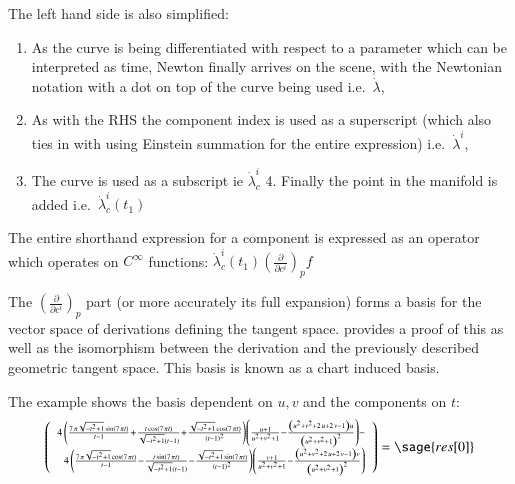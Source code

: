 \documentclass[11pt]{article}
\begin{document}
The left hand side is also simplified: 
\begin{enumerate}[itemsep=1pt, topsep=1pt, partopsep=0pt]
    \item As the curve is being differentiated with respect to a parameter which can be interpreted as time, Newton finally arrives on the scene, 
    with the Newtonian notation with a dot on top of the curve being used i.e.~\(\dot \lambda\),
    \item As with the RHS the component index is used as a superscript (which also ties in with using Einstein summation for the entire expression)
    i.e.~\(\dot \lambda^i\),
    \item The curve is used as a subscript ie \(\dot \lambda^i_c\) 4. Finally the point in the manifold is added i.e.~\(\dot \lambda^i_c(t_1)\)
\end{enumerate}    

The entire shorthand expression for a component is expressed as an operator which operates on
\(C^\infty\) functions: \(\dot \lambda^i_c(t_1) (\frac{\partial }{\partial c^i})_pf\)

The \((\frac{\partial }{\partial c^i})_p\) part (or more accurately its full expansion) forms a
basis for the vector space of derivations defining the tangent space.
\Textcite[see][pp.~82-86]{isham} provides a proof of this as well as the isomorphism between the
derivation and the previously described geometric tangent space. This basis is known as a chart
induced basis.

The example shows the basis dependent on \(u,v\) and the components on
\(t\):\\
\begin{multline*}
    \left(\begin{array}{r}
        \scriptstyle
        4 \, {\left(\frac{7 \, \pi \sqrt{-t^{2} + 1} \sin\left(7 \, \pi t\right)}{t - 1} + \frac{t \cos\left(7 \, \pi t\right)}{\sqrt{-t^{2} + 1} {\left(t - 1\right)}} + \frac{\sqrt{-t^{2} + 1} \cos\left(7 \, \pi t\right)}{{\left(t - 1\right)}^{2}}\right)} {\left(\frac{u + 1}{u^{2} + v^{2} + 1} - \frac{{\left(u^{2} + v^{2} + 2 \, u + 2 \, v - 1\right)} u}{{\left(u^{2} + v^{2} + 1\right)}^{2}}\right)} -\\
        \scriptstyle
        4 \, {\left(\frac{7 \, \pi \sqrt{-t^{2} + 1} \cos\left(7 \, \pi t\right)}{t - 1} - \frac{t \sin\left(7 \, \pi t\right)}{\sqrt{-t^{2} + 1} {\left(t - 1\right)}} - \frac{\sqrt{-t^{2} + 1} \sin\left(7 \, \pi t\right)}{{\left(t - 1\right)}^{2}}\right)} {\left(\frac{v + 1}{u^{2} + v^{2} + 1} - \frac{{\left(u^{2} + v^{2} + 2 \, u + 2 \, v - 1\right)} v}{{\left(u^{2} + v^{2} + 1\right)}^{2}}\right)}
        \end{array}\right)
        = \sage{res[0]}
\end{multline*}    
    
\end{document}
